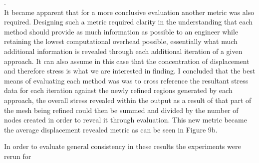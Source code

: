 \cite{ElemQualAndChecks}. \\


\noindent
It became apparent that for a more conclusive evaluation another metric was also required. Designing such a metric required clarity in the understanding that each method should provide as much information as possible to an engineer while retaining the lowest computational overhead possible, essentially what much additional information is revealed through each additional iteration of a given approach. It can also assume in this case that the concentration of displacement and therefore stress is what we are interested in finding. I concluded that the best means of evaluating each method was was to cross reference the resultant stress data for each iteration against the newly refined regions generated by each approach, the overall stress revealed within the output as a result of that part of the mesh being refined could then be summed and divided by the number of nodes created in order to reveal it through evaluation. This new metric became the average displacement revealed metric as can be seen in Figure 9b.





\noindent










In order to evaluate general consistency in these results the experiments were rerun for 


